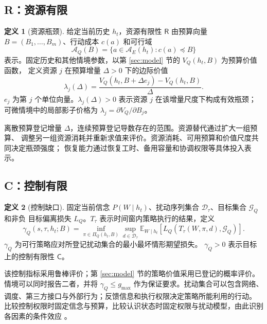 \documentclass[11pt,a4paper]{ctexart}
\numberwithin{equation}{section}
\theoremstyle{definition}
\newtheorem{definition}{定义}[section]
\theoremstyle{plain}
\newcommand{\Res}{\mathsf{R}}
\newcommand{\Ctrl}{\mathsf{C}}
\begin{document}
\subsection{R：资源有限}

\begin{definition}[资源瓶颈]
给定当前历史 $h_t$，资源有限性 $\Res$ 由预算向量 $B=(B_1,\ldots,B_m)$、行动成本 $c(a)$ 和可行域
\[
\mathcal A_Q(B)=\{a\in\mathcal A_E(h_t):c(a)\preceq B\}
\]
表示。固定历史和其他情境参数，以第 \ref{sec:model} 节的 $V_Q(h_t,B)$ 为预算价值函数，
定义资源 $j$ 在预算增量 $\Delta>0$ 下的边际价值
\begin{equation}
\lambda_j(\Delta)=
\frac{V_Q(h_t,B+\Delta e_j)-V_Q(h_t,B)}{\Delta}.
\label{eq:shadow-price}
\end{equation}
$e_j$ 为第 $j$ 个单位向量。$\lambda_j(\Delta)>0$ 表示资源 $j$ 在该增量尺度下构成有效瓶颈；
可微情境中的局部影子价格为
$\lambda_j=\partial V_Q/\partial B_j$。
\end{definition}

离散预算登记增量 $\Delta$，连续预算登记导数存在的范围。资源替代通过扩大一组预算、
调整另一组资源消耗并重新求值来评价。资源消耗、可用预算和价值尺度共同决定瓶颈强度；
恢复能力通过恢复工时、备用容量和协调权限等具体投入表示。

\subsection{C：控制有限}

\begin{definition}[控制缺口]
固定当前信念 $P(W\mid h_t)$、扰动序列集合 $\mathcal D_\tau$、目标集合 $\mathcal G_Q$ 和非负
目标偏离损失 $L_Q$。$T_\tau$ 表示时间窗内策略执行的结果，定义
\begin{equation}
\gamma_Q(s,\tau,h_t;B)=
\inf_{\pi\in\Pi_Q(h_t,B)}\sup_{d\in\mathcal D_\tau}
\mathbb E_{W\mid h_t}
\left[L_Q(T_\tau(W,\pi,d),\mathcal G_Q)\right].
\label{eq:control-gap}
\end{equation}
$\gamma_Q$ 为可行策略应对所登记扰动集合的最小最坏情形期望损失。
$\gamma_Q>0$ 表示目标上的控制有限性 $\Ctrl$。
\end{definition}

该控制指标采用鲁棒评价；第 \ref{sec:model} 节的策略价值采用已登记的概率评价。
情境可以同时报告二者，并将 $\gamma_Q\le g_{\max}$ 作为保证要求。扰动集合可以包含网络、
调度、第三方接口与外部行为；反馈信息和执行权限决定策略所能利用的行动。
比较控制权限时固定信念与预算，比较认识状态时固定权限与扰动模型，由此识别各因素的条件效应
\cite{ashby1956,skogestad2005}。
\end{document}
